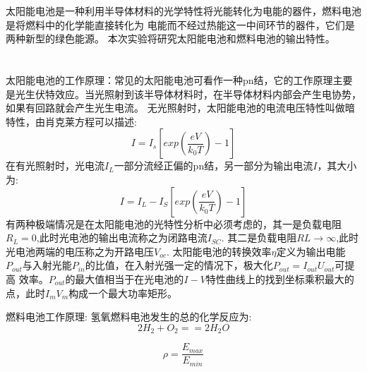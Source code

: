 ﻿\documentclass[10.5pt]{article}
\begin{document}
\title{\textbf{}} %
\author{}
\maketitle
\section{\textbf{}}
太阳能电池是一种利用半导体材料的光学特性将光能转化为电能的器件，燃料电池是将燃料中的化学能直接转化为
电能而不经过热能这一中间环节的器件，它们是两种新型的绿色能源。
本次实验将研究太阳能电池和燃料电池的输出特性。
\section{\textbf{}}

太阳能电池的工作原理：常见的太阳能电池可看作一种pn结，它的工作原理主要是光生伏特效应。当光照射到该半导体材料时，在半导体材料内部会产生电协势，如果有回路就会产生光生电流。
无光照射时，太阳能电池的电流电压特性叫做暗特性，由肖克莱方程可以描述:
\begin{equation}
I=I_s [exp(\frac{eV}{k_0 T})-1]
\end{equation}
在有光照射时，光电流$I_L$一部分流经正偏的pn结，另一部分为输出电流$I$，其大小为:
\begin{equation}
I=I_L-I_S [exp(\frac{eV}{k_0 T})-1]
\end{equation}
有两种极端情况是在太阳能电池的光特性分析中必须考虑的，其一是负载电阻$R_L=0$,此时光电池的输出电流称之为闭路电流$I_{SC}$.
其二是负载电阻$RL \rightarrow \infty $,此时光电池两端的电压称之为开路电压$V_{oc}$.
太阳能电池的转换效率$\eta$定义为输出电能$P_{out}$与入射光能$P_{in}$的比值，在入射光强一定的情况下，极大化$P_{out}=I_{out} U_{out}$可提高
效率。$P_{out}$的最大值相当于在光电池的$I-V$特性曲线上的找到坐标乘积最大的点，此时$I_m V_m$构成一个最大功率矩形。

燃料电池工作原理:
氢氧燃料电池发生的总的化学反应为:
\begin{equation}
2H_2 + O_2 ==2H_2 O
\end{equation}

\begin{equation}
\rho=\frac{E_{max}}{E_{min}}
\end{equation}

\section{\textbf{}}
\end{document}
